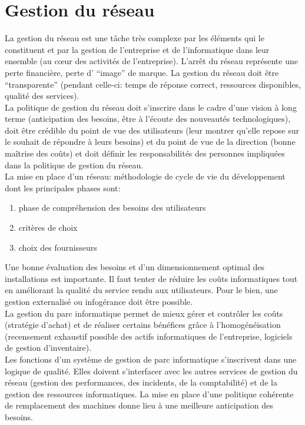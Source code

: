 \documentclass[10pt,a4paper,oneside,titlepage]{report}
\begin{document}
\section{Gestion du réseau}
La gestion du réseau est une tâche très complexe par les éléments qui le
constituent et par la gestion de l’entreprise et de l’informatique dans leur
ensemble (au cœur des activités de l’entreprise). L'arrêt du réseau représente
une perte financière, perte d’ ``image'' de marque. La gestion du réseau doit
être ``transparente'' (pendant celle-ci: temps de réponse correct, ressources
disponibles, qualité des services).\\

La politique de gestion du réseau doit s’inscrire dans le cadre d’une vision à
long terme (anticipation des besoins, être à l’écoute des nouveautés
technologiques), doit être crédible du point de vue des utilisateurs (leur
montrer qu’elle repose sur le souhait de répondre à leurs besoins) et du point
de vue de la direction (bonne maîtrise des coûts) et doit définir les
responsabilités des personnes impliquées dans la politique de gestion du réseau.
\\

La mise en place d’un réseau: méthodologie de cycle de vie du développement dont
les principales phases sont:
\begin{enumerate}
\item phase de compréhension des besoins des utilisateurs
\item critères de choix
\item choix des fournisseurs
\end{enumerate}
Une bonne évaluation des besoins et d’un dimensionnement optimal des
installations est importante. Il faut tenter de réduire les coûts informatiques
tout en améliorant la qualité du service rendu aux utilisateurs. Pour le bien,
une gestion externalisé ou infogérance doit être possible.\\

La gestion du parc informatique permet de mieux gérer et contrôler les coûts
(stratégie d’achat) et de réaliser certains bénéfices grâce à l’homogénéisation
(recensement exhaustif possible des actifs informatiques de l’entreprise,
logiciels de gestion d’inventaire).\\

Les fonctions d’un système de gestion de parc informatique s'inscrivent dans une
logique de qualité. Elles doivent s'interfacer avec les autres services de
gestion du réseau (gestion des performances, des incidents, de la comptabilité)
et de la gestion des ressources informatiques. La mise en place d’une politique
cohérente de remplacement des machines donne lieu à une meilleure anticipation
des besoins.\\
\end{document}
